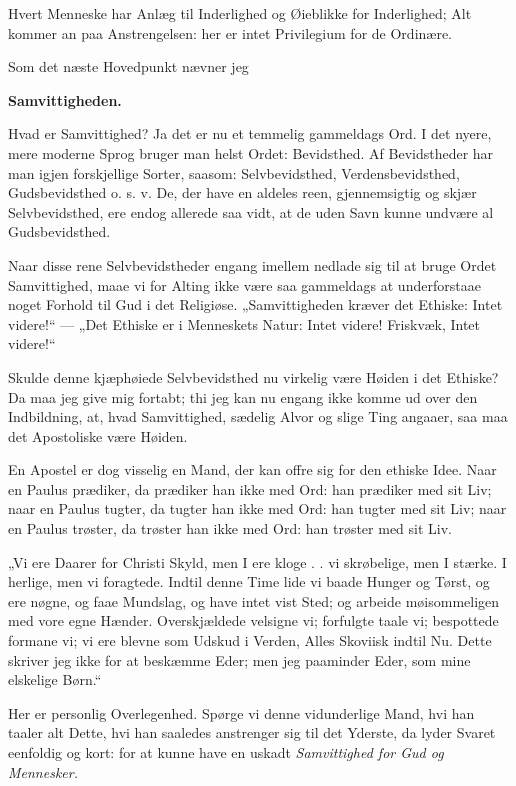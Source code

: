 \documentclass[12pt,a4paper]{book}
\newcommand{\apage}[1]{\marginnote{\footnotesize\textit{[#1]}}}
\begin{document}
Hvert Menneske har Anlæg til Inderlighed og Øieblikke for Inderlighed;
Alt kommer an paa Anstrengelsen: her er intet Privilegium for de
Ordinære.

Som det næste Hovedpunkt nævner jeg

\begin{center}
\textbf{Samvittigheden.}
\end{center}

Hvad er Samvittighed? Ja det er nu et temmelig gammeldags Ord. I det
nyere, mere moderne Sprog bruger man helst Ordet: Bevidsthed. Af
Bevidstheder har man igjen forskjellige Sorter, saasom: Selvbevidsthed,
Verdensbevidsthed, Gudsbevidsthed o. s. v. De, der have en aldeles reen,
gjennemsigtig og skjær Selvbevidsthed, ere endog allerede saa vidt, at de
uden Savn kunne undvære al Gudsbevidsthed.

Naar disse rene Selvbevidstheder engang imellem nedlade sig til at bruge
Ordet Samvittighed, maae vi for Alting ikke være saa gammeldags at
underforstaae noget Forhold til Gud i det Religiøse. „Samvittigheden
kræver det Ethiske: Intet videre!“ — „Det Ethiske er i Menneskets Natur:
Intet videre! Friskvæk, Intet videre!“

Skulde denne kjæphøiede Selvbevidsthed nu virkelig være Høiden i det
Ethiske? Da maa jeg give mig fortabt; thi jeg kan nu engang ikke komme ud
over den Indbildning, at, hvad Samvittighed, sædelig Alvor og slige Ting
angaaer, saa maa det Apostoliske være Høiden.

En Apostel er dog visselig en Mand, der kan offre sig for den ethiske
Idee. Naar en Paulus prædiker, da prædiker \apage{126}
han ikke med Ord: han prædiker med sit Liv; naar en Paulus tugter, da
tugter han ikke med Ord: han tugter med sit Liv; naar en Paulus trøster,
da trøster han ikke med Ord: han trøster med sit Liv.

„Vi ere Daarer for Christi Skyld, men I ere kloge . . vi skrøbelige, men
I stærke. I herlige, men vi foragtede. Indtil denne Time lide vi baade
Hunger og Tørst, og ere nøgne, og faae Mundslag, og have intet vist
Sted; og arbeide møisommeligen med vore egne Hænder. Overskjældede
velsigne vi; forfulgte taale vi; bespottede formane vi; vi ere blevne som
Udskud i Verden, Alles Skoviisk indtil Nu. Dette skriver jeg ikke for at
beskæmme Eder; men jeg paaminder Eder, som mine elskelige Børn.“

Her er personlig Overlegenhed. Spørge vi denne vidunderlige Mand, hvi han
taaler alt Dette, hvi han saaledes anstrenger sig til det Yderste, da
lyder Svaret eenfoldig og kort: for at kunne have en uskadt
\emph{Samvittighed for Gud og Mennesker.}
\end{document}
